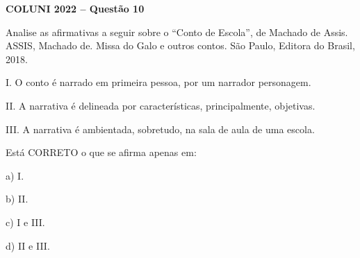 \textbf{COLUNI 2022 -- Questão 10}\par\medskip Analise as afirmativas a seguir sobre o “Conto de Escola”, de Machado de Assis. ASSIS, Machado de. Missa do Galo e outros contos. São Paulo, Editora do Brasil, 2018.

\par

I. O conto é narrado em primeira pessoa, por um narrador personagem.\par
II. A narrativa é delineada por características, principalmente, objetivas.\par
III. A narrativa é ambientada, sobretudo, na sala de aula de uma escola.

\par

Está CORRETO o que se afirma apenas em:

\par

a) I.\par
b) II.\par
c) I e III.\par
d) II e III.

